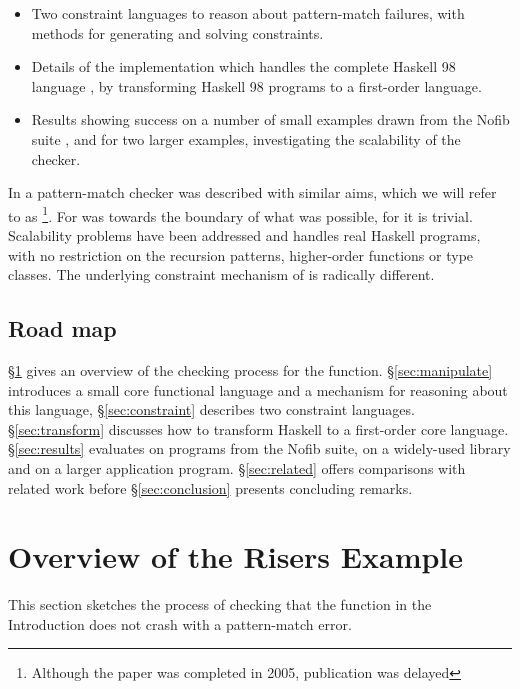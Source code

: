 \begin{itemize}
\item Two constraint languages to reason about pattern-match failures, with methods for generating and solving constraints.
\item Details of the \catch{} implementation which handles the complete Haskell 98 language \citep{haskell}, by transforming Haskell 98 programs to a first-order language.
\item Results showing success on a number of small examples drawn from the Nofib suite \citep{nofib}, and for two larger examples, investigating the scalability of the checker.
\end{itemize}

In \citet{me:catch_tfp} a pattern-match checker was described with similar aims, which we will refer to as \oldtool{}\footnote{Although the paper was completed in 2005, publication was delayed}. For \oldtool{}  was towards the boundary of what was possible, for \newtool{} it is trivial. Scalability problems have been addressed and \newtool{} handles real Haskell programs, with no restriction on the recursion patterns, higher-order functions or type classes. The underlying constraint mechanism of \newtool{} is radically different.

\subsection{Road map}

\S\ref{sec:walkthrough} gives an overview of the checking process for the  function. \S\ref{sec:manipulate} introduces a small core functional language and a mechanism for reasoning about this language, \S\ref{sec:constraint} describes two constraint languages. \S\ref{sec:transform} discusses how to transform Haskell to a first-order core language. \S\ref{sec:results} evaluates \newtool{} on programs from the Nofib suite, on a widely-used library and on a larger application program. \S\ref{sec:related} offers comparisons with related work before \S\ref{sec:conclusion} presents concluding remarks.

\section{Overview of the Risers Example}
\label{sec:walkthrough}

This section sketches the process of checking that the  function in the Introduction does not crash with a pattern-match error.



